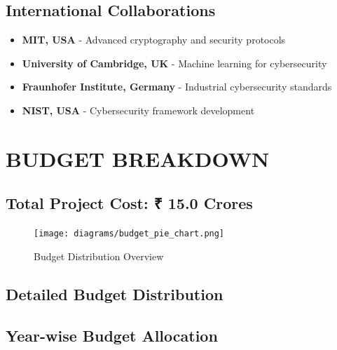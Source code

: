 \documentclass[12pt,a4paper]{article}
\begin{document}
\subsection{International Collaborations}
\begin{itemize}
\item \textbf{MIT, USA} - Advanced cryptography and security protocols
\item \textbf{University of Cambridge, UK} - Machine learning for cybersecurity
\item \textbf{Fraunhofer Institute, Germany} - Industrial cybersecurity standards
\item \textbf{NIST, USA} - Cybersecurity framework development
\end{itemize}

\section{BUDGET BREAKDOWN}

\subsection{Total Project Cost: ₹ 15.0 Crores}

\begin{figure}[H]
\centering
\texttt{[image: diagrams/budget\_pie\_chart.png]}
\caption{Budget Distribution Overview}
\label{fig:budget}
\end{figure}

\subsection{Detailed Budget Distribution}

\begin{center}
\end{center}

\subsection{Year-wise Budget Allocation}
\end{document}
